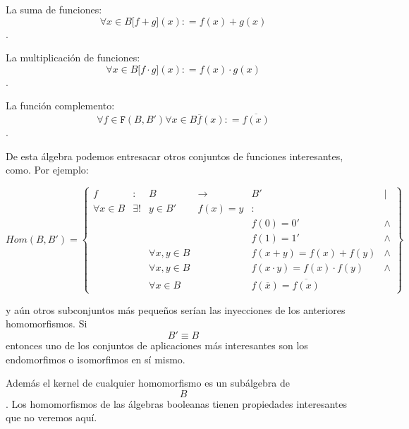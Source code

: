   La suma de funciones:
  \[\forall{x \in B}{\lbrack{f + g}\rbrack}{(x)}{: = f}{{(x)} + g}{(x)}\]
  .

  La multiplicación de funciones:
  \[\forall{x \in B}{\lbrack{f \cdot g}\rbrack}{(x)}{: = f}{{(x)} \cdot g}{(x)}\].

  La función complemento:
  \[\forall{f \in \mathtt{F}}{({B,B'})}\forall{x \in B}\overline{f}{(x)}{: = \overline{f{(x)}}}\].

  De esta álgebra podemos entresacar otros conjuntos de funciones
  interesantes, como. Por ejemplo:

  \[{\mathtt{\mathit{Hom}}{({B,B'})}} = \begin{Bmatrix}
  f & : & B & \rightarrow & {B'} & \mathbf{\mid} \\
  {\forall{x \in B}} & {\exists!} & {{y \in B}'} & {f{{(x)} = y}} & \mathbf{\mathrm{:}} & \\
   & & & & {f{{(0)} = 0}'} & \land \\
   & & & & {f{{(1)} = 1}'} & \land \\
   & & {\forall x,{y \in B}} & & {f{{({x + y})} = f}{{(x)} + f}{(y)}} & \land \\
   & & {\forall x,{y \in B}} & & {f{{({x \cdot y})} = f}{{(x)} \cdot f}{(y)}} & \land \\
   & & {\forall{x \in B}} & & {f{{(\overline{x})} = \overline{f{(x)}}}} & 
  \end{Bmatrix}\]

  y aún otros subconjuntos más pequeños serían las inyecciones de los
  anteriores homomorfismos. Si \[{B'} \equiv B\]entonces uno de los
  conjuntos de aplicaciones más interesantes son los endomorfimos o
  isomorfimos en sí mismo.

  Además el kernel de cualquier homomorfismo es un subálgebra de \[B\].
  Los homomorfismos de las álgebras booleanas tienen propiedades
  interesantes que no veremos aquí.

